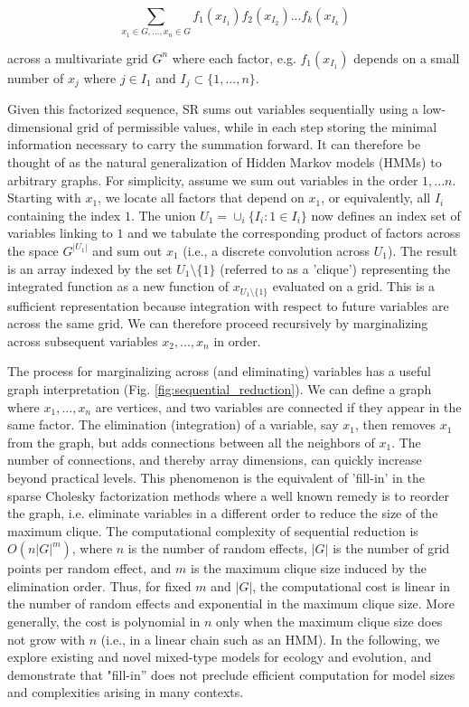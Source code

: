 \documentclass[11pt]{article}
\begin{document}
\[\sum_{x_1 \in G,...,x_n \in G} f_1(x_{I_1}) f_2(x_{I_2}) ... f_k(x_{I_k})\]

\noindent across a multivariate grid $G^n$ where each factor, e.g. $f_1(x_{I_1})$ depends on a small number of $x_j$ where $j \in I_1$ and $I_j \subset \{1,...,n\}$.

Given this factorized sequence, SR sums out variables sequentially using a low-dimensional grid of permissible values, while in each step storing the minimal information necessary to carry the summation forward. It can therefore be thought of as the natural generalization of Hidden Markov models (HMMs) to arbitrary graphs. For simplicity, assume we sum out variables in the order $1,...n$. Starting with $x_1$, we locate all factors that depend on $x_1$, or equivalently, all $I_i$ containing the index $1$. The union $U_1 = \cup_i \{I_i : 1 \in I_i\}$ now defines an index set of variables linking to $1$ and we tabulate the corresponding product of factors across the space $G^{|U_1|}$ and sum out $x_1$ (i.e., a discrete convolution across $U_1$). The result is an array indexed by the set $U_1 \setminus \{ 1 \}$ (referred to as a 'clique') representing the integrated function as a new function of $x_{U_1 \setminus \{1\}}$ evaluated on a grid. This is a sufficient representation because integration with respect to future variables are across the same grid. We can therefore proceed recursively by marginalizing across subsequent variables $x_2, ..., x_n$ in order.

The process for marginalizing across (and eliminating) variables has a useful graph interpretation (Fig. \ref{fig:sequential_reduction}). We can define a graph where $x_1,...,x_n$ are vertices, and two variables are connected if they appear in the same factor. The elimination (integration) of a variable, say $x_1$, then removes $x_1$ from the graph, but adds connections between all the neighbors of $x_1$. The number of connections, and thereby array dimensions, can quickly increase beyond practical levels. This phenomenon is the equivalent of 'fill-in' in the sparse Cholesky factorization methods \citep{davis_direct_2006} where a well known remedy is to reorder the graph, i.e. eliminate variables in a different order to reduce the size of the maximum clique. The computational complexity of sequential reduction is $O(n|G|^m)$, where $n$ is the number of random effects, $|G|$ is the number of grid points per random effect, and $m$ is the maximum clique size induced by the elimination order. Thus, for fixed $m$ and $|G|$, the computational cost is linear in the number of random effects and exponential in the maximum clique size. More generally, the cost is polynomial in $n$ only when the maximum clique size does not grow with $n$ (i.e., in a linear chain such as an HMM). In the following, we explore existing and novel mixed-type models for ecology and evolution, and demonstrate that "fill-in'' does not preclude efficient computation for model sizes and complexities arising in many contexts.
\end{document}
